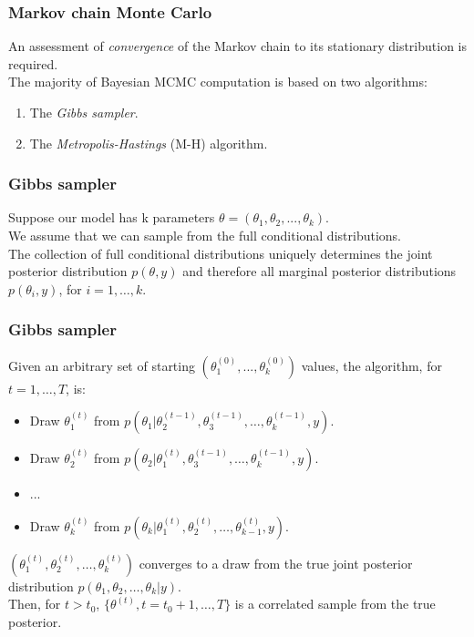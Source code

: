 \documentclass{beamer}
\newcommand{\1}{\ensuremath{\mathbf{1}}}
\begin{document}
%
%
%
\begin{frame}\frametitle{Markov chain Monte Carlo}
	An assessment of \emph{convergence} of the Markov chain to its stationary distribution is required.\\[2ex]
	The majority of Bayesian MCMC computation is based on two algorithms:
	\begin{enumerate}
		\item The \emph{Gibbs sampler}.
		\item The \emph{Metropolis-Hastings} (M-H) algorithm.
	\end{enumerate}
\end{frame}
%
%
%
\begin{frame}\frametitle{Gibbs sampler}
	Suppose our model has k parameters $\theta = (\theta_1, \theta_2, ..., \theta_k )$.\\[1.5ex]
	We assume that we can sample from the full conditional distributions.\\[1.5ex]
	The collection of full conditional distributions uniquely determines the joint posterior distribution $p(\theta,y)$ and therefore all marginal posterior distributions $p(\theta_i,y)$, for $i = 1,\ldots,k$.
\end{frame}
%
%
%
\begin{frame}\frametitle{Gibbs sampler}
	Given an arbitrary set of starting $(\theta_1^{(0)}, ..., \theta_k^{(0)})$ values, the algorithm, for $t = 1,\ldots,T$, is:
	\begin{itemize}
		\item Draw $\theta_1^{(t)}$ from $p(\theta_1|\theta_2^{(t-1)},\theta_3^{(t-1)},\ldots,\theta_k^{(t-1)},y)$.
		\item Draw $\theta_2^{(t)}$ from $p(\theta_2|\theta_1^{(t)},\theta_3^{(t-1)},\ldots,\theta_k^{(t-1)},y)$.
		\item ...
		\item Draw $\theta_k^{(t)}$ from $p(\theta_k|\theta_1^{(t)},\theta_2^{(t)},\ldots,\theta_{k-1}^{(t)},y)$.
	\end{itemize}
	$(\theta_1^{(t)},\theta_2^{(t)},\ldots,\theta_{k}^{(t)})$ converges to a draw from the true joint posterior distribution $p(\theta_1,\theta_2,\ldots,\theta_k|y)$.\\[1.5ex]
	Then, for $t > t_0$, $\{\theta^{(t)},t = t_0 +1,\ldots,T\}$ is a correlated sample from the true posterior.
\end{frame}
\end{document}
